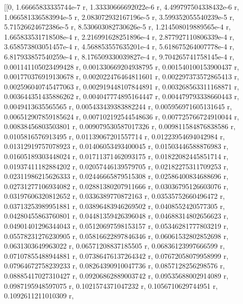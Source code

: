 \documentclass[a4paper,10pt]{article}
\begin{document}
\begin{eulernotebook}
\begin{eulercomment}
\begin{eulercomment}
\begin{eulercomment}
\begin{eulercomment}
\begin{eulercomment}
\begin{eulercomment}
\begin{eulercomment}
\begin{eulercomment}
\begin{eulercomment}
\begin{eulercomment}
\begin{eulercomment}
\begin{eulercomment}
\begin{eulercomment}
\begin{eulercomment}
\begin{eulercomment}
\begin{eulercomment}
\begin{eulercomment}
\begin{eulercomment}
\begin{eulercomment}
\begin{eulercomment}
\begin{eulercomment}
\begin{eulercomment}
\begin{eulercomment}
\begin{eulercomment}
\begin{eulercomment}
\begin{eulercomment}
\begin{eulercomment}
\begin{eulercomment}
\begin{euleroutput}
          [[0, 1.66665833335744e-7 r, 1.33330666692022e-6 r, 
  4.499797504338432e-6 r, 1.066581336583994e-5 r, 
  2.083072932167196e-5 r, 3.599352055540239e-5 r, 
  5.71526624672386e-5 r, 8.530603082730626e-5 r, 
  1.214508019889565e-4 r, 1.665833531718508e-4 r, 
  2.216991628251896e-4 r, 2.877927110806339e-4 r, 
  3.658573803051457e-4 r, 4.568853557635201e-4 r, 
  5.618675264007778e-4 r, 6.817933857540259e-4 r, 
  8.176509330039827e-4 r, 9.704265741758145e-4 r, 
  0.001141105023499428 r, 0.001330669204938795 r, 
  0.001540100153900437 r, 0.001770376919130678 r, 
  0.002022476464811601 r, 0.002297373572865413 r, 
  0.002596040745477063 r, 0.002919448107844891 r, 
  0.003268563311168871 r, 0.003644351435886262 r, 
  0.004047774895164447 r, 0.004479793338660443 r, 0.0049413635565565 r, 
  0.005433439383882244 r, 0.005956971605131645 r, 
  0.006512907859185624 r, 0.007102192544548636 r, 
  0.007725766724910044 r, 0.00838456803503801 r, 
  0.009079530587017326 r, 0.009811584876838586 r, 0.0105816576913495 r, 
  0.01139067201557714 r, 0.01223954694042984 r, 0.01312919757078923 r, 
  0.01406053493400045 r, 0.01503446588876983 r, 0.01605189303448024 r, 
  0.01711371462093175 r, 0.01822082445851714 r, 0.01937411182884202 r, 
  0.02057446139579705 r, 0.02182275311709253 r, 0.02311986215626333 r, 
  0.02446665879515308 r, 0.02586400834688696 r, 0.02731277106934082 r, 
  0.02881380207911666 r, 0.03036795126603076 r, 0.03197606320812652 r, 
  0.0336389770872163 r, 0.03535752660496472 r, 0.03713253989951881 r, 
  0.03896483946269502 r, 0.0408552420577305 r, 0.04280455863760801 r, 
  0.04481359426396048 r, 0.04688314802656623 r, 0.04901401296344043 r, 
  0.05120697598153157 r, 0.05346281777803219 r, 0.05578231276230905 r, 
  0.05816622897846346 r, 0.06061532802852698 r, 0.0631303649963022 r, 
  0.06571208837185505 r, 0.06836123997666599 r, 0.07107855488944881 r, 
  0.07386476137264342 r, 0.07672058079958999 r, 0.07964672758239233 r, 
  0.08264390910047736 r, 0.0857128256298576 r, 0.08885417027310427 r, 
  0.09206862889003742 r, 0.09535688002914089 r, 0.0987195948597075 r, 
  0.1021574371047232 r, 0.1056710629744951 r, 0.1092611211010309 r, 

\end{euleroutput}
\end{eulercomment}
\end{eulercomment}
\end{eulercomment}
\end{eulercomment}
\end{eulercomment}
\end{eulercomment}
\end{eulercomment}
\end{eulercomment}
\end{eulercomment}
\end{eulercomment}
\end{eulercomment}
\end{eulercomment}
\end{eulercomment}
\end{eulercomment}
\end{eulercomment}
\end{eulercomment}
\end{eulercomment}
\end{eulercomment}
\end{eulercomment}
\end{eulercomment}
\end{eulercomment}
\end{eulercomment}
\end{eulercomment}
\end{eulercomment}
\end{eulercomment}
\end{eulercomment}
\end{eulercomment}
\end{eulercomment}
\end{eulernotebook}
\end{document}
